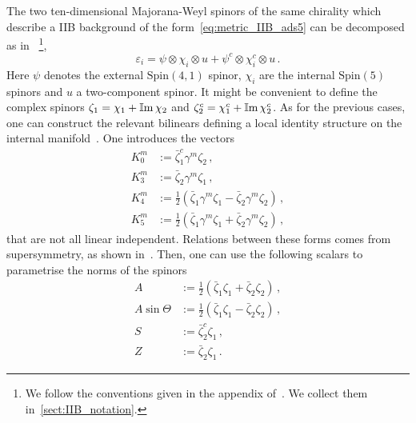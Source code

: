 \documentclass[debug]{phd}
\begin{document}
%
%
%
%
The two ten-dimensional Majorana-Weyl spinors of the same chirality which describe a IIB background of the form~\eqref{eq:metric_IIB_ads5} can be decomposed as in~\cite{Grana_Ntokos}%
		\footnote{%
		We follow the conventions given in the appendix of~\cite{Grana_Ntokos}.
		We collect them in~\cref{sect:IIB_notation}.
		},
%	
	\begin{equation} 
	\label{eq:splitting_IIB_ads5}
		\varepsilon_i= \psi \otimes \chi_i \otimes u + \psi^c \otimes \chi_i^c \otimes u\, . 
	\end{equation} 
Here $\psi$ denotes the external $\mathrm{Spin(4,1)}$ spinor, $\chi_i$ are the internal $\mathrm{Spin}(5)$ spinors and $u$ a two-component spinor. 
It might be convenient to define the complex spinors $\zeta_1 = \chi_1 + \operatorname{\mathbb{I}m} \chi_2$ and $\zeta_2^c = \chi_1^c + \operatorname{\mathbb{I}m} \chi_2^c$.
As for the previous cases, one can construct the relevant bilinears defining a local identity structure on the internal manifold~\cite{Gauntlett:2005ww}. 
One introduces the vectors
%
\begin{equation} 
\label{IIBbil}
	\begin{aligned}
 		K_0^m &:= \bar{\zeta}_1^c\gamma^m\zeta_2\, , \\
 		K^m_3 &:= \bar{\zeta}_2\gamma^m\zeta_1 \, ,\\
 		K^m_4 &:= \tfrac{1}{2}\left(\bar{\zeta}_1\gamma^m\zeta_1 - \bar{\zeta}_2\gamma^m\zeta_2\right)\, , \\
 		K^m_5 &:= \tfrac{1}{2}\left(\bar{\zeta}_1\gamma^m\zeta_1 + \bar{\zeta}_2\gamma^m\zeta_2\right)\, ,
\end{aligned}
\end{equation} 
%
that are not all linear independent. 
Relations between these forms comes from supersymmetry, as shown in~\cite{Gauntlett:2005ww}. 
Then, one can use the following scalars to parametrise the norms of the spinors
%
\begin{equation} 
\label{scalarbilIIB}
	\begin{aligned}
 		A &:= \tfrac{1}{2}\left(\bar{\zeta}_1\zeta_1 + \bar{\zeta}_2\zeta_2\right)\, , \\
		A\sin\Theta &:= \tfrac{1}{2}\left(\bar{\zeta}_1\zeta_1 - \bar{\zeta}_2\zeta_2\right)\, , \\
		S &:= \bar{\zeta}^c_2\zeta_1\, , \\
		Z &:= \bar{\zeta}_2\zeta_1\, .
	\end{aligned}
\end{equation} 
\end{document}

